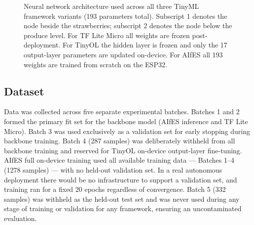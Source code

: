 \begin{figure}[htbp]
\caption{Neural network architecture used across all three TinyML framework variants (193 parameters total). Subscript 1 denotes the node beside the strawberries; subscript 2 denotes the node below the produce level. For TF Lite Micro all weights are frozen post-deployment. For TinyOL the hidden layer is frozen and only the 17 output-layer parameters are updated on-device. For AIfES all 193 weights are trained from scratch on the ESP32.}
\label{fig:nn_architecture}
\end{figure}

\subsection{Dataset}

Data was collected across five separate experimental batches. Batches 1 and 2 formed the primary fit set for the backbone model (AIfES inference and TF Lite Micro). Batch 3 was used exclusively as a validation set for early stopping during backbone training. Batch 4 (287 samples) was deliberately withheld from all backbone training and reserved for TinyOL on-device output-layer fine-tuning. AIfES full on-device training used all available training data --- Batches 1--4 (1278 samples) --- with no held-out validation set. In a real autonomous deployment there would be no infrastructure to support a validation set, and training ran for a fixed 20 epochs regardless of convergence. Batch 5 (332 samples) was withheld as the held-out test set and was never used during any stage of training or validation for any framework, ensuring an uncontaminated evaluation.

